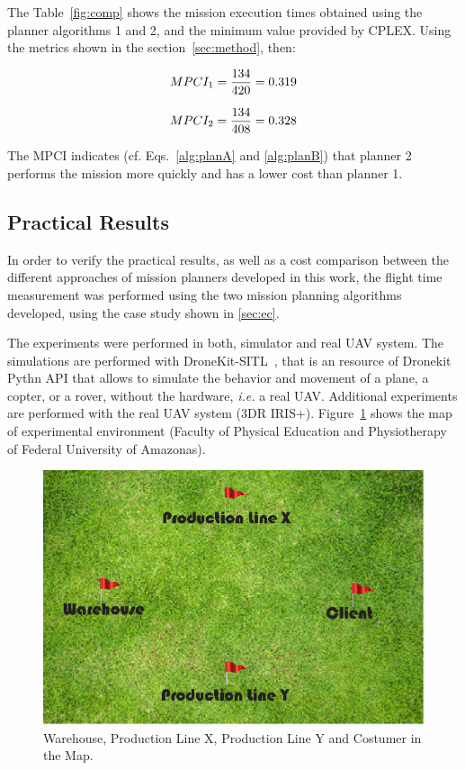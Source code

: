 \documentclass[conference]{IEEEtran}
\begin{document}
The Table~\ref{fig:comp} shows the mission execution times obtained using the planner algorithms 1 and 2, and the minimum value provided by CPLEX. Using the metrics shown in the section~\ref{sec:method}, then:

\begin{equation}
\small
MPCI_1=\frac{134}{420}=0.319
\label{eq1}
\end{equation}


\begin{equation}
\small
MPCI_2=\frac{134}{408}=0.328
\label{eq2}
\end{equation}

The MPCI indicates (cf. Eqs.~\eqref{alg:planA} and \eqref{alg:planB}) that planner 2 performs the mission more quickly and has a lower cost than planner 1.

\subsection{Practical Results}

In order to verify the practical results, as well as a cost comparison between the different approaches of mission planners developed in this work, the flight time measurement was performed using the two mission planning algorithms developed, using the case study shown in \ref{sec:ec}.

The experiments were performed in both, simulator and real UAV system. The simulations are performed with DroneKit-SITL~\cite{dronekit}, that is an resource of Dronekit Pythn API that allows to simulate the behavior and movement of a plane, a copter, or a rover, without the hardware, {\it i.e.} a real UAV.  Additional experiments are performed with the real UAV system (3DR IRIS+). Figure~\ref{fig:maps} shows the map of experimental environment (Faculty of Physical Education and Physiotherapy of Federal University of Amazonas).

		\begin{figure}[H]
	\centering
	\includegraphics[width=0.7\columnwidth]{map.eps}
	\caption{Warehouse, Production Line X, Production Line Y and Costumer in the Map.\label{fig:maps}}
	\end{figure}
%           
\end{document}
